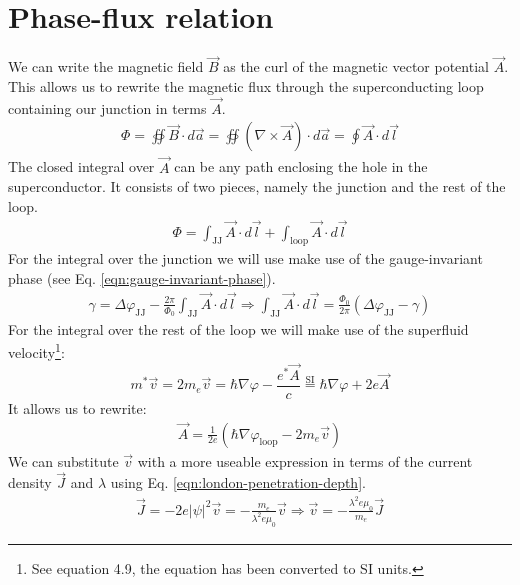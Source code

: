 \section{Phase-flux relation}
\label{app:derivation-phase-flux-relation}
We can write the magnetic field $\vec{B}$ as the curl of the magnetic vector potential $\vec{A}$. This allows us to rewrite the magnetic flux through the superconducting loop containing our junction in terms $\vec{A}$.
\begin{align}
	\Phi = \oiint \vec{B} \cdot d\vec{a} = \oiint \left(\nabla \times \vec{A}\right) \cdot d\vec{a} = \oint \vec{A} \cdot d\vec{l}
\end{align}
The closed integral over $\vec{A}$ can be any path enclosing the hole in the superconductor. It consists of two pieces, namely the junction and the rest of the loop.
\begin{align}
	\Phi = \int_{\text{JJ}} \vec{A} \cdot d\vec{l} + \int_{\text{loop}} \vec{A} \cdot d\vec{l}
	\label{eqn:magnetic-potential-integral}
\end{align}
For the integral over the junction we will use make use of the gauge-invariant phase (see Eq. \ref{eqn:gauge-invariant-phase}).
\begin{align}
	\gamma = \Delta\varphi_{\text{JJ}} - \frac{2\pi}{\Phi_0}\int_{\text{JJ}}\vec{A} \cdot d\vec{l} \Rightarrow \int_{\text{JJ}}\vec{A} \cdot d\vec{l} = \frac{\Phi_0}{2\pi} \left(\Delta\varphi_{\text{JJ}} - \gamma\right)
\end{align}
For the integral over the rest of the loop we will make use of the superfluid velocity\footnote{See  equation 4.9, the equation has been converted to SI units.}:
\begin{equation}
	m^*\vec{v} = 2m_e\vec{v} = \hbar \nabla \varphi - \frac{e^*\vec{A}}{c} \stackrel{\text{SI}}{=} \hbar \nabla \varphi + 2e\vec{A}
	\label{eqn:superfluid-velocity}
\end{equation}
It allows us to rewrite:
\begin{align}
	\vec{A} = \frac{1}{2e}\left(\hbar \nabla \varphi_{\text{loop}} - 2m_e\vec{v}\right)
\end{align}
We can substitute $\vec{v}$ with a more useable expression in terms of the current density $\vec{J}$ and $\lambda$ using Eq. \ref{eqn:london-penetration-depth}.
\begin{align}
	\vec{J} = -2e|\psi|^2\vec{v} = -\frac{m_e}{\lambda^2e\mu_0}\vec{v} \Rightarrow \vec{v} = -\frac{\lambda^2e\mu_0}{m_e}\vec{J}
\end{align}
